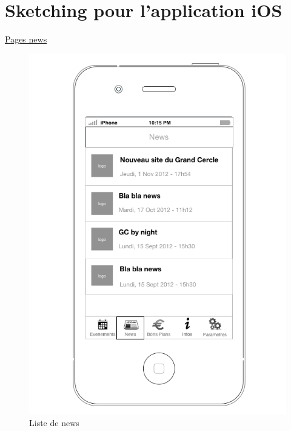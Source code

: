 \documentclass[a4paper, 11px]{article}
\begin{document}
\section{Sketching pour l'application iOS}
\label{sketchiOS}
\underline{Pages news}
\begin{figure}[h!]
	\begin{minipage}[c]{.50\linewidth}
		\begin{center}
			\includegraphics[scale=0.3]{../../Sketch/iOS/news_liste.png}
		\end{center}
	\caption{Liste de news}


\end{minipage}
\end{figure}
\end{document}
